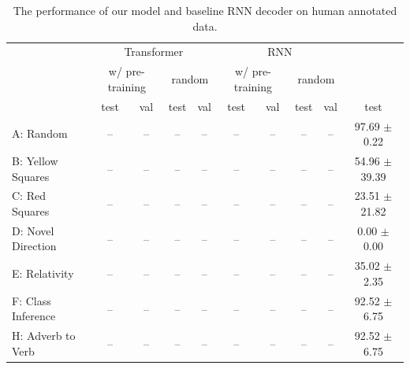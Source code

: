 \documentclass[11pt]{article}
\begin{document}
\begin{table}
	\begin{center}
		\begin{tabularx}{\textwidth}{ l|ccccccccc }
			\toprule
			\multicolumn{1}{c}{} 
			& \multicolumn{4}{c}{Transformer}  
			& \multicolumn{4}{c}{RNN}  
			& \\
			\cmidrule{3-4}
			\cmidrule{7-8}
			\multicolumn{1}{c}{} 
			& \multicolumn{2}{c}{w/ pre-training}  
			& \multicolumn{2}{c}{random}
			& \multicolumn{2}{c}{w/ pre-training}  
			& \multicolumn{2}{c}{random}
			& \multicolumn{1}{c}{\cite{ruis2020benchmark}}\\
			& test  & val  & test &  val & test &  val & test & val & test  \\
			\midrule
			A: Random & --  & --  & -- &  -- & -- &  -- & -- &  -- & 97.69 $\pm$ 0.22\\
			B: Yellow Squares & --  & --  & -- &  -- & -- &  -- & -- &  -- &  54.96 $\pm$ 39.39\\
			C: Red Squares & --  & --  & -- &  -- & -- &  -- & -- &  -- & 23.51 $\pm$ 21.82\\
			D: Novel Direction & --  & --  & -- & -- & -- &  -- & -- &  -- & 0.00 $\pm$ 0.00 \\
			E: Relativity & --  & --  & -- & -- & -- &  -- & -- &  -- & 35.02 $\pm$ 2.35 \\
			F: Class Inference & --  & --  & -- &  -- &-- &  -- & -- &  -- &  92.52 $\pm$ 6.75 \\
			H: Adverb to Verb & --  & --  & -- &  -- &-- &  -- & -- &  -- &  92.52 $\pm$ 6.75 \\
			\bottomrule
		\end{tabularx}
	\end{center}
	\caption{The performance of our model and baseline RNN decoder on human annotated data.}
	\label{tab:human_results}
\end{table}
\end{document}
